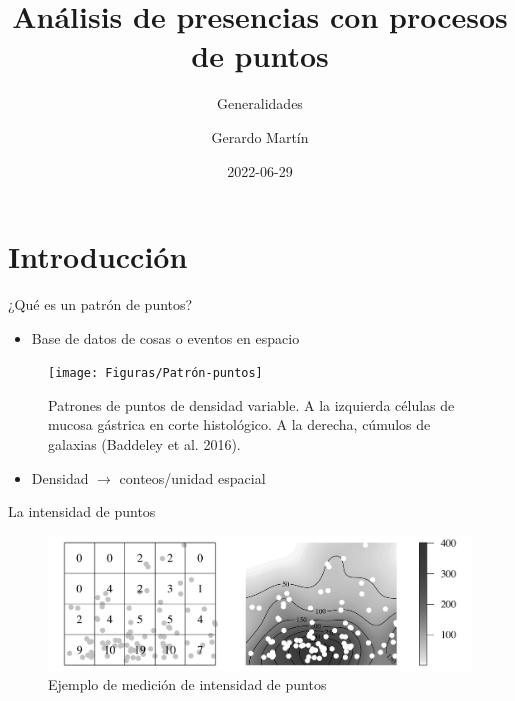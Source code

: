 \documentclass[
  11pt,
  ignorenonframetext,
]{beamer}
\title{Análisis de presencias con procesos de puntos}
\subtitle{Generalidades}
\author{Gerardo Martín}
\date{2022-06-29}
\providecommand{\tightlist}{%
  \setlength{\itemsep}{0pt}\setlength{\parskip}{0pt}}
\begin{document}
\frame{\titlepage}

\hypertarget{introducciuxf3n}{%
\section{Introducción}\label{introducciuxf3n}}

\begin{frame}{¿Qué es un patrón de puntos?}
\protect\hypertarget{quuxe9-es-un-patruxf3n-de-puntos}{}
\begin{itemize}
\tightlist
\item
  Base de datos de cosas o eventos en espacio
\end{itemize}

\begin{figure}
\texttt{[image: Figuras/Patrón-puntos]} \caption{Patrones de puntos de densidad variable. A la izquierda células de mucosa gástrica en corte histológico. A la derecha, cúmulos de galaxias (Baddeley et al. 2016).}\label{fig:patron}
\end{figure}

\begin{itemize}
\tightlist
\item
  Densidad \(\rightarrow\) conteos/unidad espacial
\end{itemize}
\end{frame}

\begin{frame}{La intensidad de puntos}
\protect\hypertarget{la-intensidad-de-puntos}{}
\begin{figure}
\includegraphics[width=5.06in]{Figuras/Ejemplo-patron-puntos} \caption{Ejemplo de medición de intensidad de puntos}\label{fig:unnamed-chunk-1}
\end{figure}
\end{frame}
\end{document}
